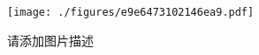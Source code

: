 
\begin{figure}[ht]
\centering
\texttt{[image: ./figures/e9e6473102146ea9.pdf]}
\caption{请添加图片描述} \label{fig_thanks_1}
\end{figure}
